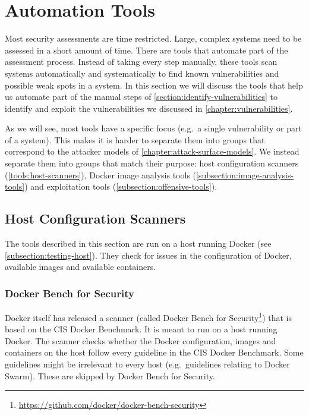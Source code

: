 \section{Automation Tools}\label{section:tools}
Most security assessments are time restricted. Large, complex systems need to be assessed in a short amount of time. There are tools that automate part of the assessment process. Instead of taking every step manually, these tools scan systems automatically and systematically to find known vulnerabilities and possible weak spots in a system. In this section we will discuss the tools that help us automate part of the manual steps of \autoref{section:identify-vulnerabilities} to identify and exploit the vulnerabilities we discussed in \autoref{chapter:vulnerabilities}.

As we will see, most tools have a specific focus (e.g.\ a single vulnerability or part of a system). This makes it is harder to separate them into groups that correspond to the attacker models of \autoref{chapter:attack-surface-models}. We instead separate them into groups that match their purpose: host configuration scanners (\autoref{tools:host-scanners}), Docker image analysis tools (\autoref{subsection:image-analysis-tools}) and exploitation tools (\autoref{subsection:offensive-tools}).

\subsection{Host Configuration Scanners}\label{tools:host-scanners}
The tools described in this section are run on a host running Docker (see \autoref{subsection:testing-host}). They check for issues in the configuration of Docker, available images and available containers.

\subsubsection{Docker Bench for Security}\label{tools:bench}
Docker itself has released a scanner (called Docker Bench for Security\footnote{\url{https://github.com/docker/docker-bench-security}}) that is based on the CIS Docker Benchmark. It is meant to run on a host running Docker. The scanner checks whether the Docker configuration, images and containers on the host follow every guideline in the CIS Docker Benchmark. Some guidelines might be irrelevant to every host (e.g.\ guidelines relating to Docker Swarm). These are skipped by Docker Bench for Security.

